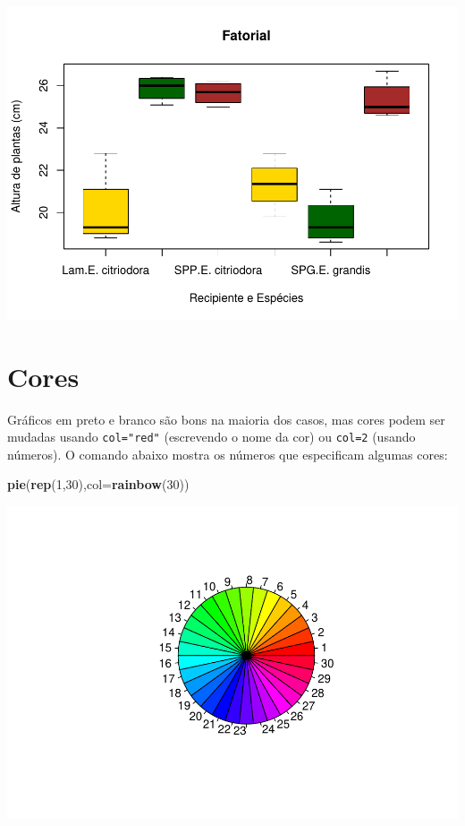 \documentclass[
]{book}
\newenvironment{Shaded}{\begin{snugshade}}{\end{snugshade}}
\newcommand{\DataTypeTok}[1]{\textcolor[rgb]{0.13,0.29,0.53}{#1}}
\newcommand{\DecValTok}[1]{\textcolor[rgb]{0.00,0.00,0.81}{#1}}
\newcommand{\KeywordTok}[1]{\textcolor[rgb]{0.13,0.29,0.53}{\textbf{#1}}}
\newcommand{\NormalTok}[1]{#1}
\begin{document}
\includegraphics{TudodoR_files/figure-latex/unnamed-chunk-174-1.pdf}

\hypertarget{cores}{%
\section{Cores}\label{cores}}

Gráficos em preto e branco são bons na maioria dos casos, mas cores podem ser mudadas usando \texttt{col="red"} (escrevendo o nome da cor) ou \texttt{col=2} (usando números).
O comando abaixo mostra os números que especificam algumas cores:

\begin{Shaded}
\begin{Highlighting}[]
\KeywordTok{pie}\NormalTok{(}\KeywordTok{rep}\NormalTok{(}\DecValTok{1}\NormalTok{,}\DecValTok{30}\NormalTok{),}\DataTypeTok{col=}\KeywordTok{rainbow}\NormalTok{(}\DecValTok{30}\NormalTok{))}
\end{Highlighting}
\end{Shaded}

\includegraphics{TudodoR_files/figure-latex/unnamed-chunk-175-1.pdf}
\end{document}
